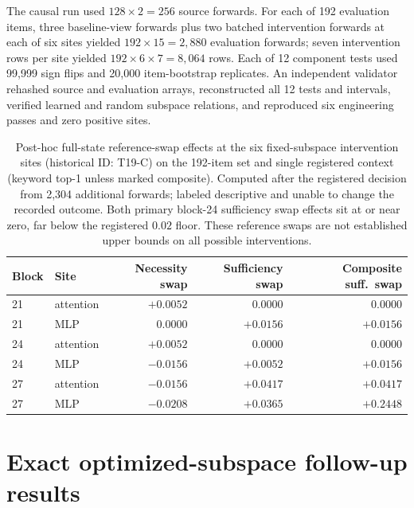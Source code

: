 \documentclass{article}
\begin{document}
The causal run used $128\times2=256$ source forwards. For each of 192
evaluation items, three baseline-view forwards plus two batched intervention
forwards at each of six sites yielded $192\times15=2{,}880$ evaluation
forwards; seven intervention rows per site yielded
$192\times6\times7=8{,}064$ rows. Each of 12 component tests used 99,999 sign flips and
20,000 item-bootstrap replicates. An independent validator rehashed source and
evaluation arrays, reconstructed all 12 tests and intervals, verified learned
and random subspace relations, and reproduced six engineering passes and zero
positive sites.

\begin{table}[H]
\centering
\scriptsize
\setlength{\tabcolsep}{4pt}
\begin{tabular}{llrrr}
\toprule
Block & Site & Necessity swap & Sufficiency swap & Composite suff.\ swap \\
\midrule
21 & attention & $+0.0052$ & $0.0000$ & $0.0000$ \\
21 & MLP       & $0.0000$  & $+0.0156$ & $+0.0156$ \\
24 & attention & $+0.0052$ & $0.0000$ & $0.0000$ \\
24 & MLP       & $-0.0156$ & $+0.0052$ & $+0.0156$ \\
27 & attention & $-0.0156$ & $+0.0417$ & $+0.0417$ \\
27 & MLP       & $-0.0208$ & $+0.0365$ & $+0.2448$ \\
\bottomrule
\end{tabular}
\caption{Post-hoc full-state reference-swap effects at the six fixed-subspace
intervention sites (historical ID: T19-C) on the
192-item set and single registered context (keyword top-1 unless marked
composite). Computed after the registered decision from 2,304 additional
forwards; labeled descriptive and unable to change the recorded outcome. Both
primary block-24 sufficiency swap effects sit at or near zero, far below the
registered $0.02$ floor. These reference swaps are not established upper
bounds on all possible interventions.}
\label{tab:posthoc}
\end{table}

\section{Exact optimized-subspace follow-up results}
\label{app:t20}
\end{document}

